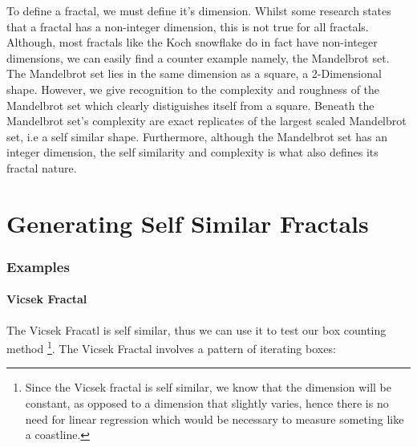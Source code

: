 \documentclass[11pt]{article}
\begin{document}
To define a fractal, we must define it's dimension. Whilst some research states that a fractal has a non-integer dimension, this is not true for all fractals. Although, most fractals like the Koch snowflake do in fact have non-integer dimensions, we can easily find a counter example namely, the Mandelbrot set. The Mandelbrot set lies in the same dimension as a square, a 2-Dimensional shape. However, we give recognition to the complexity and roughness of the Mandelbrot set which clearly distiguishes itself from a square. Beneath the Mandelbrot set's complexity are exact replicates of the largest scaled Mandelbrot set, i.e a self similar shape. Furthermore, although the Mandelbrot set has an integer dimension, the self similarity and complexity is what also defines its fractal nature. 

\section{Generating Self Similar Fractals}
\label{sec:orge8073af}
\subsubsection{Examples}
\label{sec:org256ba84}
\paragraph{Vicsek Fractal}
\label{sec:orga51c820}
The Vicsek Fracatl is self similar, thus we can use it to test our box counting method \footnote{Since the Vicsek fractal is self similar, we know that the dimension will be constant, as opposed to a dimension that slightly varies, hence there is no need for linear regression which would be necessary to measure someting like a coastline.}.
The Vicsek Fractal involves a pattern of iterating boxes:
\end{document}
